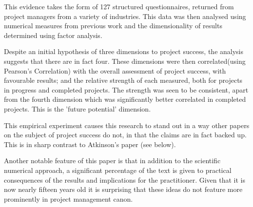 This evidence takes the form of 127 structured questionnaires, returned from project managers from a variety of industries. This data was then analysed using numerical measures from previous work and the dimensionality of results determined using factor analysis.

Despite an initial hypothesis of three dimensions to project success, the analysis suggests that there are in fact four. These dimensions were then correlated(using Pearson's Correlation) with the overall assessment of project success, with favourable results; and the relative strength of each measured, both for projects in progress and completed projects. The strength was seen to be consistent, apart from the fourth dimension which was significantly better correlated in completed projects. This is the 'future potential' dimension. 

This empirical experiment causes this research to stand out in a way other papers on the subject of project success do not, in that the claims are in fact backed up. This is in sharp contrast to Atkinson's paper (see below).

Another notable feature of this paper is that in addition to the scientific numerical approach, a significant percentage of the text is given to practical consequences of the results and implications for the practitioner. Given that it is now nearly fifteen years old it is surprising that these ideas do not feature more prominently in project management canon.
%
%
%


